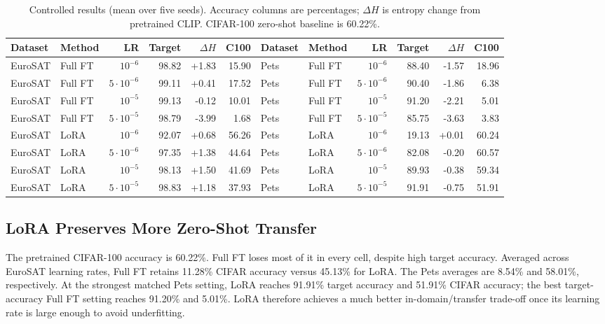 \documentclass[conference]{IEEEtran}
\begin{document}
\begin{table}[t]
\caption{Controlled results (mean over five seeds). Accuracy columns are percentages; $\Delta H$ is entropy change from pretrained CLIP. CIFAR-100 zero-shot baseline is 60.22\%.}
\label{tab:results}
\centering
\scriptsize
\setlength{\tabcolsep}{3.8pt}
\begin{tabular}{llrrrr|llrrrr}
\toprule
Dataset & Method & LR & Target & $\Delta H$ & C100 & Dataset & Method & LR & Target & $\Delta H$ & C100 \\
\midrule
EuroSAT & Full FT & $10^{-6}$ & 98.82 & +1.83 & 15.90 & Pets & Full FT & $10^{-6}$ & 88.40 & -1.57 & 18.96 \\
EuroSAT & Full FT & $5\cdot10^{-6}$ & 99.11 & +0.41 & 17.52 & Pets & Full FT & $5\cdot10^{-6}$ & 90.40 & -1.86 & 6.38 \\
EuroSAT & Full FT & $10^{-5}$ & 99.13 & -0.12 & 10.01 & Pets & Full FT & $10^{-5}$ & 91.20 & -2.21 & 5.01 \\
EuroSAT & Full FT & $5\cdot10^{-5}$ & 98.79 & -3.99 & 1.68 & Pets & Full FT & $5\cdot10^{-5}$ & 85.75 & -3.63 & 3.83 \\
\addlinespace
EuroSAT & LoRA & $10^{-6}$ & 92.07 & +0.68 & 56.26 & Pets & LoRA & $10^{-6}$ & 19.13 & +0.01 & 60.24 \\
EuroSAT & LoRA & $5\cdot10^{-6}$ & 97.35 & +1.38 & 44.64 & Pets & LoRA & $5\cdot10^{-6}$ & 82.08 & -0.20 & 60.57 \\
EuroSAT & LoRA & $10^{-5}$ & 98.13 & +1.50 & 41.69 & Pets & LoRA & $10^{-5}$ & 89.93 & -0.38 & 59.34 \\
EuroSAT & LoRA & $5\cdot10^{-5}$ & 98.83 & +1.18 & 37.93 & Pets & LoRA & $5\cdot10^{-5}$ & 91.91 & -0.75 & 51.91 \\
\bottomrule
\end{tabular}
\end{table}

\subsection{LoRA Preserves More Zero-Shot Transfer}
The pretrained CIFAR-100 accuracy is 60.22\%. Full FT loses most of it in every cell, despite high target accuracy. Averaged across EuroSAT learning rates, Full FT retains 11.28\% CIFAR accuracy versus 45.13\% for LoRA. The Pets averages are 8.54\% and 58.01\%, respectively. At the strongest matched Pets setting, LoRA reaches 91.91\% target accuracy and 51.91\% CIFAR accuracy; the best target-accuracy Full FT setting reaches 91.20\% and 5.01\%. LoRA therefore achieves a much better in-domain/transfer trade-off once its learning rate is large enough to avoid underfitting.
\end{document}
